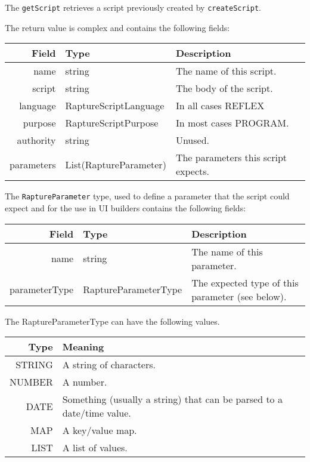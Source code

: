 The \verb+getScript+ retrieves a script previously created by \verb+createScript+.

The return value is complex and contains the following fields:

\begin{table}[h]
  \small
\begin{center}
\begin{tabular}{r l p{8cm}}
  Field & Type & Description \\
  \hline
  name & string & The name of this script.\\
  script & string & The body of the script.\\
  language & RaptureScriptLanguage & In all cases REFLEX \\
  purpose & RaptureScriptPurpose & In most cases PROGRAM.\\
  authority & string &  Unused.\\
  parameters & List(RaptureParameter) & The parameters this script expects.\\
\end{tabular}
\end{center}
\end{table}

The \verb+RaptureParameter+ type, used to define a parameter that the script could expect
and for the use in UI builders contains the following fields:

\begin{table}[h]
  \small
\begin{center}
\begin{tabular}{r l p{6cm}}
  Field & Type & Description \\
  \hline
  name & string & The name of this parameter.\\
  parameterType & RaptureParameterType & The expected type of this parameter (see below).\\
\end{tabular}
\end{center}
\end{table}

The RaptureParameterType can have the following values.

\begin{table}[h]
  \small
\begin{center}
\begin{tabular}{r p{10cm}}
  Type & Meaning \\
  \hline
  STRING & A string of characters.\\
  NUMBER & A number.\\
  DATE & Something (usually a string) that can be parsed to a date/time value.\\
  MAP & A key/value map.\\
  LIST & A list of values.\\
\end{tabular}
\end{center}
\end{table}
